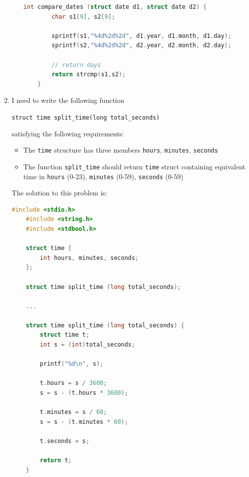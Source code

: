 \documentclass[12pt]{article}
\begin{document}
\begin{enumerate}[1.]
\begin{enumerate}[a)]
\begin{lstlisting}[language=c]
    int compare_dates (struct date d1, struct date d2) {
        char s1[9], s2[9];

        sprintf(s1,"%4d%2d%2d", d1.year, d1.month, d1.day);
        sprintf(s2,"%4d%2d%2d", d2.year, d2.month, d2.day);

        // return days
        return strcmp(s1,s2);
    }
\end{lstlisting}
    \end{enumerate}

    \item

    I need to write the following function

    \bigskip

    \texttt{struct time split\_time(long total\_seconds)}

    \bigskip

    satisfying the following requirements:

    \begin{itemize}
        \item The \texttt{time} structure has three members \texttt{hours}, \texttt{minutes}, \texttt{seconds}
        \item The function \texttt{split\_time} should return \texttt{time} struct containing
        equivalent time in \texttt{hours} (0-23), \texttt{minutes} (0-59), \texttt{seconds} (0-59)
    \end{itemize}

    \bigskip

    The solution to this problem is:

\begin{lstlisting}[language=c]
    #include <stdio.h>
    #include <string.h>
    #include <stdbool.h>

    struct time {
        int hours, minutes, seconds;
    };

    struct time split_time (long total_seconds);

    ...

    struct time split_time (long total_seconds) {
        struct time t;
        int s = (int)total_seconds;

        printf("%d\n", s);

        t.hours = s / 3600;
        s = s - (t.hours * 3600);

        t.minutes = s / 60;
        s = s - (t.minutes * 60);

        t.seconds = s;

        return t;
    }
\end{lstlisting}


\end{enumerate}
\end{document}
